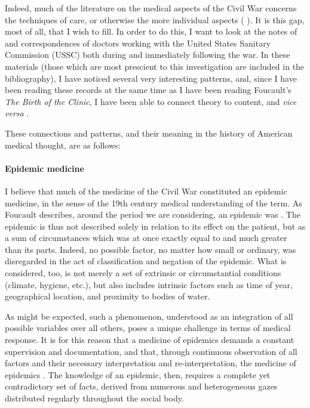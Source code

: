 \documentclass{report}
\begin{document}
  Indeed, much of the literature on the medical aspects of the Civil War concerns the techniques of care, or otherwise the more individual aspects 
  (\citeauthor{Devine2016} ). It is this gap, most of all, that I wish to fill. In order to do this, I want to look at the notes of and
  correspondences of doctors working with the United States Sanitary Commission (USSC) both during and immediately following the war. In these materials 
  (those which are most prescient to this investigation are included in the bibliography), I have noticed several very interesting patterns, and, since I have
  been reading these records at the same time as I have been reading Foucault's \textit{The Birth of the Clinic}, I have been able to connect theory to
  content, and \textit{vice versa} \autocite{Foucault1994}.

  These connections and patterns, and their meaning in the history of American medical thought, are as follows:
  \paragraph{Epidemic medicine}\label{par:epidemic_medicine} %
  I believe that much of the medicine of the Civil War constituted an epidemic medicine, in the sense of the 19th century medical understanding of the term.
  As Foucault describes, around the period we are considering, an epidemic was  \autocite[pp. 23]{Foucault1994}. The epidemic is thus not described solely in relation to its
  effect on the patient, but as a sum of circumstances which was at once exactly equal to and much greater than its parts. Indeed, no possible factor,
  no matter how small or ordinary, was disregarded in the act of classification and negation of the epidemic. What is considered, too, is not merely a set
  of extrinsic or circumstantial conditions (climate, hygiene, etc.), but also includes intrinsic factors such as time of year, geographical location,
  and proximity to bodies of water. 

  As might be expected, such a phenomenon, understood as an integration of all possible variables over all others, poses a unique challenge in terms of medical
  response. It is for this reason that a medicine of epidemics demands a constant supervision and documentation, and that, through continuous observation
  of all factors and their necessary interpretation and re-interpretation, the medicine of epidemics  \autocite[pp. 25]{Foucault1994}. The knowledge of an epidemic, then, requires a complete
  yet contradictory set of facts, derived from numerous and heterogeneous gazes distributed regularly throughout the social body. 
\end{document}
